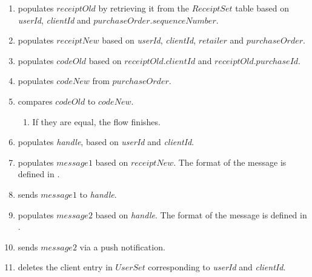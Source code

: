 \documentclass[a4paper,10pt,draft]{article}
\newcommand{\handle}{\emph{handle}}
\newcommand{\userId}{\emph{userId}}
\newcommand{\clientId}{\emph{clientId}}
\begin{document}
\begin{enumerate}
 \item \Server{} populates $receiptOld$ by retrieving it from the $ReceiptSet$ 
table based on \userId{}, \clientId{} and $purchaseOrder.sequenceNumber$.
 \item \Server{} populates $receiptNew$ based on \userId{}, \clientId{}, 
$retailer$ and $purchaseOrder$.
 \item \Server{} populates $codeOld$ based on $receiptOld.clientId$ and
$receiptOld.purchaseId$.
 \item \Server{} populates $codeNew$ from $purchaseOrder$.
 \item \Server{} compares $codeOld$ to $codeNew$.
 \begin{enumerate}
  \item If they are equal, the flow finishes.
 \end{enumerate}
 \item \Server{} populates \handle{}, based on \userId{} and \clientId{}.
 \item \Server{} populates $message1$ based on $receiptNew$. The format of the 
message is defined in \cite{UI_spec}.
 \item \Server{} sends $message1$ to \handle{}.
 \item \Server{} populates $message2$ based on \handle{}. The format of the 
message is defined in \cite{UI_spec}.
 \item \Server{} sends $message2$ via a push notification.
 \item \Server{} deletes the client entry in $UserSet$ corresponding to 
\userId{} and \clientId{}.
\end{enumerate}



\end{document}
